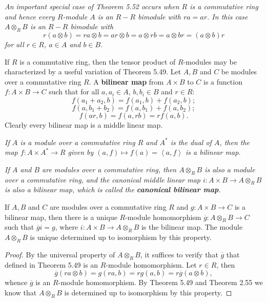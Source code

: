 \begin{note}\em
An important special case of Theorem 5.52 occurs when $R$ is a commutative ring and hence every $R$-module $A$ is an $R-R$ bimodule with $ra=ar$. In this case $A\otimes_RB$ is an $R-R$ bimodule with 
$$
r\left( a\otimes b \right) =ra\otimes b=ar\otimes b=a\otimes rb=a\otimes br=\left( a\otimes b \right) r
$$
for all $r\in R$, $a\in A$ and $b\in B
$.
\end{note}
If $R$ is a commutative ring, then the tensor product of $R$-modules may be characterized by a useful variation of Theorem 5.49. Let $A,B$ and $C$ be modules over a commutative ring $R$. A \textbf{bilinear map} from $A\times B$ to $C$ is a function $f:A\times B\to C$ such that for all $a,a_i\in A$, $b,b_i\in B$ and $r\in R$: 
$$
f\left( a_1+a_2,b \right) =f\left( a_1,b \right) +f\left( a_2,b \right) ;
$$
$$
f\left( a,b_1+b_2 \right) =f\left( a,b_1 \right) +f\left( a,b_2 \right) ;
$$
$$
f\left( ar,b \right) =f\left( a,rb \right) =rf\left( a,b \right) .
$$
Clearly every bilinear map is a middle linear map.
\begin{example}\em
If $A$ is a module over a commutative ring $R$ and $A^*$ is the dual of $A$, then the map $f:A\times A^*\to R$ given by $(a,f)\mapsto f(a)=\left<a,f\right>$ is a bilinear map.
\end{example}
\begin{example}\em
If $A$ and $B$ are modules over a commutative ring, then $A\otimes_RB$ is also a module over a commutative ring, and the canonical middle linear map $i:A\times B\to A\otimes_RB$ is also a bilinear map, which is called the \textbf{canonical bilinear map}.
\end{example}
\begin{theorem}
If $A,B$ and $C$ are modules over a commutative ring $R$ and $g:A\times B\to C$ is a bilinear map, then there is a unique $R$-module homomorphism $\overline{g}:A\otimes_RB\to C$ such that $\overline{g}i=g$, where $i:A\times B\to A\otimes_RB$ is the bilinear map. The module $A\otimes_RB$ is unique determined up to isomorphism by this property.
\end{theorem}
\begin{proof}
By the universal property of $A\otimes_RB$, it suffices to verify that $\overline{g}$ that defined in Theorem 5.49 is an $R$-module homomorphism. Let $r\in R$, then 
$$
\overline{g}\left( ra\otimes b \right) =g\left( ra,b \right) =rg\left( a,b \right) =r\overline{g}\left( a\otimes b \right) ,
$$
whence $\overline{g}$ is an $R$-module homomorphism. By Theorem 5.49 and Theorem 2.55 we know that $A\otimes_RB$ is determined up to isomorphism by this property.
\end{proof}
